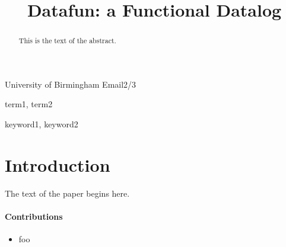 \documentclass[preprint]{sigplanconf}
\begin{document}
\setlength{\pdfpageheight}{\paperheight}
\setlength{\pdfpagewidth}{\paperwidth}




\title{Datafun: a Functional Datalog}




           {University of Birmingham}
           {Email2/3}

\maketitle


\begin{abstract}
This is the text of the abstract.
\end{abstract}


\terms
term1, term2

\keywords
keyword1, keyword2

\section{Introduction}

The text of the paper begins here.

\paragraph{Contributions}
\begin{itemize}
\item foo
\end{itemize}
\end{document}
